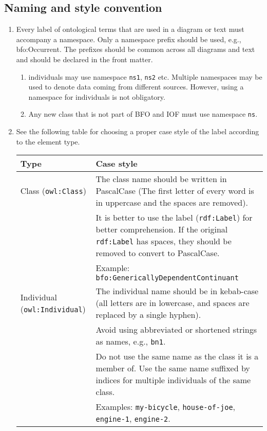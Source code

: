 \subsection*{Naming and style convention}

\begin{enumerate}
    \item Every label of ontological terms that are used in a diagram or text must accompany a namespace. Only a namespace prefix should be used, e.g., bfo:Occurrent. The prefixes should be common across all diagrams and text and should be declared in the front matter. 
        \begin{enumerate}
            \item individuals may use namespace \texttt{ns1}, \texttt{ns2} etc. Multiple namespaces may be used to denote data coming from different sources. However, using a namespace for individuals is not obligatory. 
            \item Any new class that is not part of BFO and IOF must use namespace \texttt{ns}.
        \end{enumerate}

    \item See the following table for choosing a proper case style of the label according to the element type.

\begin{tabular}{|>{\raggedright\arraybackslash}m{3.8cm}|>{\raggedright\arraybackslash}m{10cm}|}
\hline
\textbf{Type} & \textbf{Case style} \\ \hline

Class (\texttt{owl:Class}) & 
The class name should be written in PascalCase (The first letter of every word is in uppercase and the spaces are removed). \\
& It is better to use the label (\texttt{rdf:Label}) for better comprehension. If the original \texttt{rdf:Label} has spaces, they should be removed to convert to PascalCase. \\
& Example: \texttt{bfo:GenericallyDependentContinuant} \\ \hline

Individual (\texttt{owl:Individual}) & 
The individual name should be in kebab-case (all letters are in lowercase, and spaces are replaced by a single hyphen). \\
& Avoid using abbreviated or shortened strings as names, e.g., \texttt{bn1}. \\
& Do not use the same name as the class it is a member of. Use the same name suffixed by indices for multiple individuals of the same class. \\
& Examples: \texttt{my-bicycle}, \texttt{house-of-joe}, \texttt{engine-1}, \texttt{engine-2}. \\ \hline


\end{tabular}
\end{enumerate}
